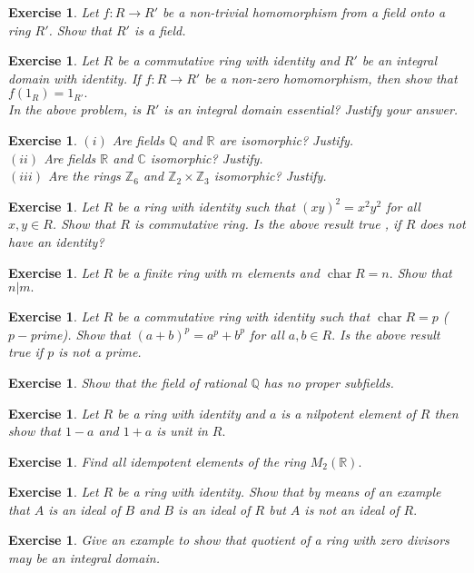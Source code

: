 \documentclass[11pt]{amsart}
\newtheorem{ex}[theorem]{Exercise}
\newcommand{\QQ}{\mathbb Q}
\newcommand{\ZZ}{\mathbb Z}
\newcommand{\CC}{\mathbb C}
\newcommand{\RR}{\mathbb R}
\DeclareMathOperator{\ch}{\text{char}}
\begin{document}
\begin{ex}
Let $f:R\to R'$ be a non-trivial homomorphism from a field onto a ring $R'$. Show that $R'$ is a field.
\end{ex}
\begin{ex}
Let $R$ be a commutative ring with identity and $R'$ be an integral domain with identity. If $f:R\to R'$ be a non-zero homomorphism, then show that $f(1_R)=1_{R'}.$\\
In the above problem, is $R'$ is an integral domain essential? Justify your answer.
\end{ex}
\begin{ex}
$(i)$ Are fields ${\QQ}$ and ${\RR}$ are isomorphic? Justify.\\
$(ii)$ Are fields ${\RR}$ and ${\CC}$ isomorphic? Justify.\\
$(iii)$ Are the rings ${\ZZ}_6$ and ${\ZZ}_2\times {\ZZ}_3$ isomorphic? Justify.
\end{ex}
\begin{ex}
Let $R$ be a ring with identity such that $(xy)^2=x^2y^2$ for all $x,y\in R$. Show that $R$ is commutative ring. Is the above result true , if $R$ does not have an identity?
\end{ex}
\begin{ex}
Let $R$ be a finite ring with $m$ elements and $\ch R=n.$ Show that $n|m.$ 
\end{ex}
\begin{ex}
Let $R$ be a commutative ring with identity such that $\ch R=p$ ($p-$prime). Show that $(a+b)^p=a^p+b^p$ for all $a,b\in R.$ Is the above result true if $p$ is not a prime.
\end{ex}
\begin{ex}
Show that the field of rational ${\QQ}$ has no proper subfields.
\end{ex}
\begin{ex}
Let $R$ be a ring with identity and $a$ is a nilpotent element of $R$ then show that $1-a$ and $1+a$ is unit in $R.$
\end{ex}
\begin{ex}
Find all idempotent elements of the ring $M_2({\RR}).$
\end{ex}
\begin{ex}
Let $R$ be a ring with identity. Show that by means of an example that $A$ is an ideal of $B$ and $B$ is an ideal of $R$ but $A$ is not an ideal of $R.$
\end{ex}
\begin{ex}
Give an example to show that quotient of a ring with zero divisors may be an integral domain.
\end{ex}
\end{document}
